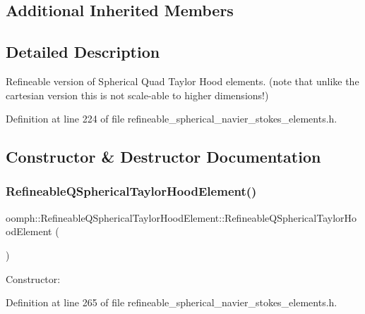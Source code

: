 \subsection*{Additional Inherited Members}


\subsection{Detailed Description}
Refineable version of Spherical Quad Taylor Hood elements. (note that unlike the cartesian version this is not scale-\/able to higher dimensions!) 

Definition at line 224 of file refineable\+\_\+spherical\+\_\+navier\+\_\+stokes\+\_\+elements.\+h.



\subsection{Constructor \& Destructor Documentation}
\mbox{\label{classoomph_1_1RefineableQSphericalTaylorHoodElement_ae5d1a4f1c2aa7b1322afcb91b0661ae3}} 
\subsubsection{\texorpdfstring{Refineable\+Q\+Spherical\+Taylor\+Hood\+Element()}{RefineableQSphericalTaylorHoodElement()}}
{\footnotesize\ttfamily oomph\+::\+Refineable\+Q\+Spherical\+Taylor\+Hood\+Element\+::\+Refineable\+Q\+Spherical\+Taylor\+Hood\+Element (\begin{DoxyParamCaption}{ }\end{DoxyParamCaption})\hspace{0.3cm}{\ttfamily [inline]}}



Constructor\+: 



Definition at line 265 of file refineable\+\_\+spherical\+\_\+navier\+\_\+stokes\+\_\+elements.\+h.



